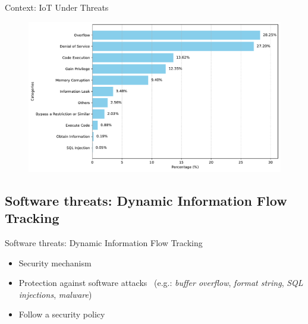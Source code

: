 \begin{frame}{Context: IoT Under Threats}
    \begin{center}
        \begin{minipage}[r]{.55\textwidth}
            \begin{figure}
                \centering
                \includegraphics[width=\textwidth]{src/1_introduction/img/threats_iot_graph.pdf}
            \end{figure}
        \end{minipage}\hspace{.5cm}%
        \begin{minipage}[c]{0.3\textwidth}
        \end{minipage}
    \end{center}
\end{frame}

\subsection{Software threats: Dynamic Information Flow Tracking}
\begin{frame}{Software threats: Dynamic Information Flow Tracking}
    \begin{block}{}
        \begin{itemize}
            [square]
            \justifying
            \item Security mechanism
            \item Protection against software attacks~\cite{HAK-21-acmcsur} (e.g.: \textit{buffer overflow}, \textit{format string}, \textit{SQL injections}, \textit{malware})
            \item Follow a security policy
        \end{itemize}
    \end{block}
\end{frame}

